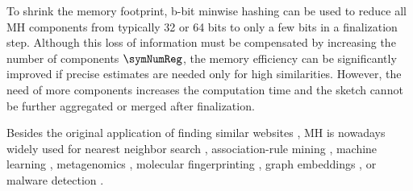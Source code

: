 \documentclass[sigconf, nonacm]{acmart}
\begin{document}
To shrink the memory footprint, b-bit minwise hashing \cite{Li2010} can be used to reduce all \ac{MH} components from typically 32 or 64 bits to only a few bits in a finalization step. Although this loss of information must be compensated by increasing the number of components $\symNumReg$, the memory efficiency can be significantly improved if precise estimates are needed only for high similarities. However, the need of more components increases the computation time and the sketch cannot be further aggregated or merged after finalization.

Besides the original application of finding similar websites \cite{Henzinger2006}, \ac{MH} is nowadays widely used for nearest neighbor search \cite{Indyk1998}, association-rule mining \cite{Cohen2001}, machine learning \cite{Li2011}, metagenomics \cite{Ondov2016, Berlin2015,Marcais2019, Elworth2020}, molecular fingerprinting \cite{Probst2018}, graph embeddings \cite{Beres2019}, or malware detection \cite{Raff2017, Nissim2019}.
\end{document}
